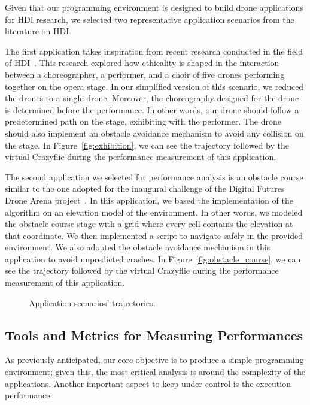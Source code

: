 Given that our programming environment is designed to build drone applications for HDI research, we selected two representative application scenarios from the literature on HDI.

The first application takes inspiration from recent research conducted in the field of HDI~\cite{eriksson2020ethicsInMovement}. 
This research explored how ethicality is shaped in the interaction between a choreographer, a performer, and a choir of five drones performing together on the opera stage.
In our simplified version of this scenario, we reduced the drones to a single drone. 
Moreover, the choreography designed for the drone is determined before the performance.
In other words, our drone should follow a predetermined path on the stage, exhibiting with the performer. 
The drone should also implement an obstacle avoidance mechanism to avoid any collision on the stage.
In Figure~\ref{fig:exhibition}, we can see the trajectory followed by the virtual Crazyflie during the performance measurement of this application.

The second application we selected for performance analysis is an obstacle course similar to the one adopted for the inaugural challenge of the Digital Futures Drone Arena project~\cite{dronearenaChallenge}.
In this application, we based the implementation of the algorithm on an elevation model of the environment. 
In other words, we modeled the obstacle course stage with a grid where every cell contains the elevation at that coordinate.
We then implemented a script to navigate safely in the provided environment. 
We also adopted the obstacle avoidance mechanism in this application to avoid unpredicted crashes.
In Figure~\ref{fig:obstacle_course}, we can see the trajectory followed by the virtual Crazyflie during the performance measurement of this application.

\begin{figure}[t]
    \centering
    \quad
    \caption{Application scenarios' trajectories.}\label{fig:application_traj}
\end{figure}

\subsection{Tools and Metrics for Measuring Performances}\label{subsec:performance_metrics}
As previously anticipated, our core objective is to produce a simple programming environment; given this, the most critical analysis is around the complexity of the applications.
Another important aspect to keep under control is the execution performance 

